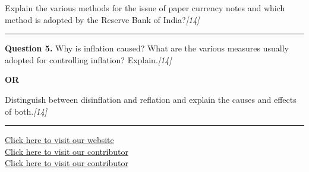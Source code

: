 \documentclass[11pt,a4paper]{article}
\newcommand{\pts}[1]{\hfill   \textit{[#1]}}
\begin{document}
Explain the various methods for the issue of paper currency notes and which method is adopted by the Reserve Bank of India?\pts{14}

\medskip\rule{\linewidth}{0.2pt}




\noindent   \textbf{Question 5.}
Why is inflation caused? What are the various measures usually adopted for controlling inflation? Explain.\pts{14}

\centerline{   \textbf{OR}}

Distinguish between disinflation and reflation and explain the causes and effects of both.\pts{14}

\vfill
\rule{\linewidth}{0.4pt}

\begin{center}\small
\href{https://bhu-exam.vercel.app/}{Click here to visit our website}\\[4pt]
\href{https://me-aryan.vercel.app/}{Click here to visit our contributor}\\[4pt]
\href{https://quashan-me.vercel.app/}{Click here to visit our contributor}
\end{center}
\end{document}
